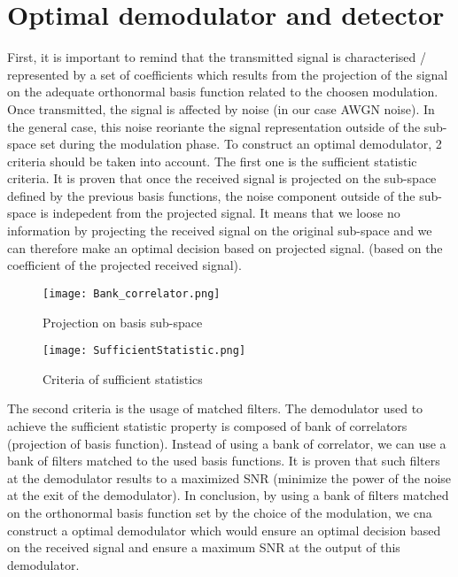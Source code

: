\section{Optimal demodulator and detector}

First, it is important to remind that the transmitted signal is characterised / represented by a set of coefficients which results from the projection
 of the signal on the adequate orthonormal basis function related to the choosen modulation.
 Once transmitted, the signal is affected by noise (in our case AWGN noise).  In the general case, this noise reoriante the signal representation outside of the sub-space set during the modulation phase.
To construct an optimal demodulator, 2 criteria should be taken into account.  The first one is the sufficient statistic criteria.  It is proven that once the received signal
is projected on the sub-space defined by the previous basis functions, the noise component outside of the sub-space is indepedent from the projected signal.
It means that we loose no information by projecting the received signal on the original sub-space and we can therefore make an optimal decision based on projected signal.
(based on the coefficient of the projected received signal).

\begin{figure}[H]
    \centering
    \texttt{[image: Bank\_correlator.png]}
    \caption{Projection on basis sub-space}
    \label{fig:Bank_correlator}
\end{figure}

\begin{figure}[H]
    \centering
    \texttt{[image: SufficientStatistic.png]}
    \caption{Criteria of sufficient statistics}
    \label{fig:Sufficientstatistic}
\end{figure}

The second criteria is the usage of matched filters. The demodulator used to achieve the sufficient statistic property is composed of bank of correlators (projection of basis function).
Instead of using a bank of correlator, we can use a bank of filters matched to the used basis functions.  It is proven that such filters at the demodulator results to
 a maximized SNR (minimize the power of the noise at the exit of the demodulator).
In conclusion, by using a bank of filters matched on the orthonormal basis function set by the choice of the modulation, we cna construct a optimal demodulator which
 would ensure an optimal decision based on the received signal and ensure a maximum SNR at the output of this demodulator.

